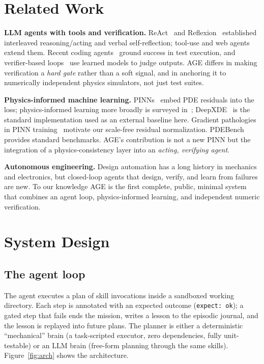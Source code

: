 \documentclass[conference,10pt]{IEEEtran}
\begin{document}
\section{Related Work}
\textbf{LLM agents with tools and verification.} ReAct~\cite{yao2023} and
Reflexion~\cite{shinn2023} established interleaved reasoning/acting and
verbal self-reflection; tool-use and web agents~\cite{wang2023,park2023}
extend them. Recent coding agents~\cite{jimenez2024} ground success in test
execution, and verifier-based loops~\cite{li2022} use learned models to
judge outputs. AGE differs in making verification a \emph{hard gate} rather
than a soft signal, and in anchoring it to numerically independent physics
simulators, not just test suites.

\textbf{Physics-informed machine learning.} PINNs~\cite{raissi2019} embed
PDE residuals into the loss; physics-informed learning more broadly is
surveyed in~\cite{karniadakis2021}; DeepXDE~\cite{lu2021} is the standard
implementation used as an external baseline here. Gradient pathologies in
PINN training~\cite{wang2021} motivate our scale-free residual normalization.
PDEBench~\cite{takamoto2022} provides standard benchmarks. AGE's contribution
is not a new PINN but the integration of a physics-consistency layer into an
\emph{acting, verifying agent}.

\textbf{Autonomous engineering.} Design automation has a long history in
mechanics and electronics, but closed-loop agents that design, verify, and
learn from failures are new. To our knowledge AGE is the first complete,
public, minimal system that combines an agent loop, physics-informed
learning, and independent numeric verification.

\section{System Design}
\subsection{The agent loop}
The agent executes a plan of skill invocations inside a sandboxed working
directory. Each step is annotated with an expected outcome
(\texttt{expect: ok}); a gated step that fails ends the mission, writes a
lesson to the episodic journal, and the lesson is replayed into future
plans. The planner is either a deterministic ``mechanical'' brain (a
task-scripted executor, zero dependencies, fully unit-testable) or an LLM
brain (free-form planning through the same skills). Figure~\ref{fig:arch}
shows the architecture.
\end{document}
